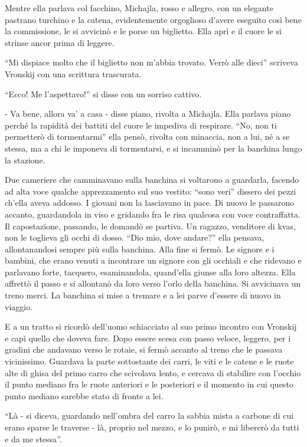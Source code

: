 Mentre ella parlava col facchino, Michajla, rosso e allegro, con un elegante pastrano turchino e la catena, evidentemente orgoglioso d'avere eseguito così bene la commissione, le si avvicinò e le porse un biglietto. Ella aprì e il cuore le si strinse ancor prima di leggere. 

``Mi dispiace molto che il biglietto non m'abbia trovato. Verrò alle dieci'' scriveva Vronskij con una scrittura trascurata. 

``Ecco! Me l'aspettavo!'' si disse con un sorriso cattivo. 

- Va bene, allora va' a casa - disse piano, rivolta a Michajla. Ella parlava piano perché la rapidità dei battiti del cuore le impediva di respirare. ``No, non ti permetterò di tormentarmi'' ella pensò, rivolta con minaccia, non a lui, né a se stessa, ma a chi le imponeva di tormentarsi, e si incamminò per la banchina lungo la stazione. 

Due cameriere che camminavano sulla banchina si voltarono a guardarla, facendo ad alta voce qualche apprezzamento sul suo vestito: ``sono veri'' dissero dei pezzi ch'ella aveva addosso. I giovani non la lasciavano in pace. Di nuovo le passarono accanto, guardandola in viso e gridando fra le risa qualcosa con voce contraffatta. Il capostazione, passando, le domandò se partiva. Un ragazzo, venditore di kvas, non le toglieva gli occhi di dosso. ``Dio mio, dove andare?'' ella pensava, allontanandosi sempre più sulla banchina. Alla fine si fermò. Le signore e i bambini, che erano venuti a incontrare un signore con gli occhiali e che ridevano e parlavano forte, tacquero, esaminandola, quand'ella giunse alla loro altezza. Ella affrettò il passo e si allontanò da loro verso l'orlo della banchina. Si avvicinava un treno merci. La banchina si mise a tremare e a lei parve d'essere di nuovo in viaggio. 

E a un tratto si ricordò dell'uomo schiacciato al suo primo incontro con Vronskij e capì quello che doveva fare. Dopo essere scesa con passo veloce, leggero, per i gradini che andavano verso le rotaie, si fermò accanto al treno che le passava vicinissimo. Guardava la parte sottostante dei carri, le viti e le catene e le ruote alte di ghisa del primo carro che scivolava lento, e cercava di stabilire con l'occhio il punto mediano fra le ruote anteriori e le posteriori e il momento in cui questo punto mediano sarebbe stato di fronte a lei. 

``Là - si diceva, guardando nell'ombra del carro la sabbia mista a carbone di cui erano sparse le traverse - là, proprio nel mezzo, e lo punirò, e mi libererò da tutti e da me stessa''. 

